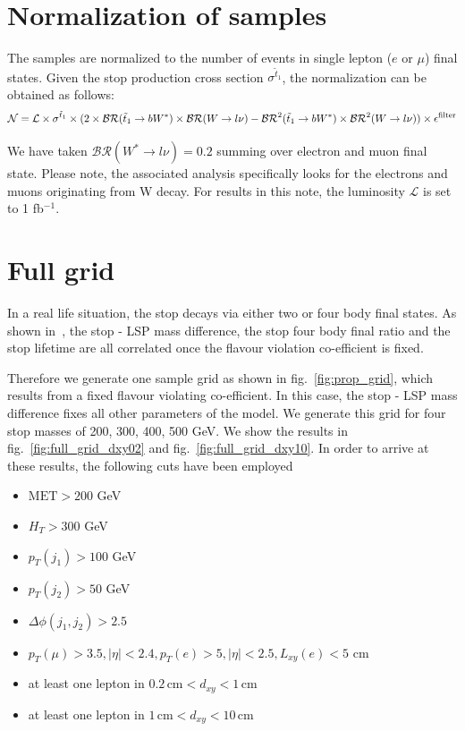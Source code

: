 \documentclass[prd,reprint,nofootinbib,notitlepage,aps,tightenlines,amsmath,amssymb,showpacs,superscriptaddress]{revtex4-1}
\begin{document}
\section{Normalization of samples}
The samples are normalized to the number of events in single lepton ($e$ or $\mu$) final states. Given the stop production cross section $\sigma^{\tilde t_1}$, the normalization can be obtained as follows: 
\begin{equation}
    \mathcal{N} = \mathcal{L}\times \sigma^{\tilde t_1}\times(2\times\mathcal{BR}(\tilde t_1 \rightarrow b W^*) \times\mathcal{BR}(W\rightarrow l \nu) - \mathcal{BR}^2(\tilde t_1 \rightarrow b W^*) \times\mathcal{BR}^2(W\rightarrow l \nu))\times \epsilon^{\rm{filter}}
\end{equation}

We have taken $\mathcal{BR}(W^*\rightarrow l \nu) = 0.2$ summing over electron and muon final state. Please note, the associated analysis specifically looks for the electrons and muons originating from W decay. For results in this note, the luminosity $\mathcal{L}$ is set to 1 fb$^{-1}$. 
\section{Full grid}
In a real life situation, the stop decays via either two or four body final states. As shown in~\cite{Grober:2014aha}, the stop - LSP mass difference, the stop four body final ratio and the stop lifetime are all correlated once the flavour violation co-efficient is fixed. 

Therefore we generate one sample grid as shown in fig.~\ref{fig:prop_grid}, which results from a fixed flavour violating co-efficient. In this case, the stop - LSP mass difference fixes all other parameters of the model. We generate this grid for four stop masses of 200, 300, 400, 500 GeV. We show the results in fig.~\ref{fig:full_grid_dxy02} and fig.~\ref{fig:full_grid_dxy10}. In order to arrive at these results, the following cuts have been employed
\begin{itemize}
    \item $\textrm{MET} > 200 $ GeV
    \item $H_T > 300$ GeV
    \item $p_T(j_1) > 100 $ GeV 
    \item $p_T(j_2) > 50 $ GeV 
    \item $\Delta \phi(j_1, j_2) > 2.5$
    \item $p_T(\mu) > 3.5, |\eta| < 2.4, p_T(e) > 5, |\eta| < 2.5, L_{xy}(e) < 5$ cm
    \item at least one lepton in $0.2\, \textrm{cm} < d_{xy} < 1\, \textrm{cm} $
    \item at least one lepton in $1\, \textrm{cm} < d_{xy} < 10\, \textrm{cm} $
\end{itemize}
\end{document}
